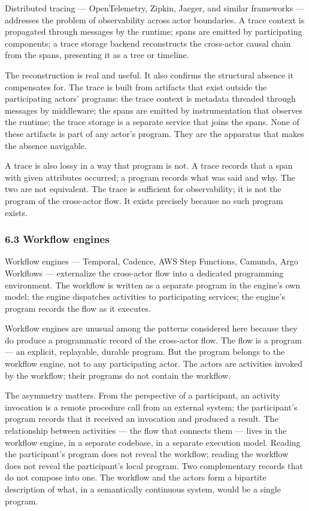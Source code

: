 \documentclass[
]{article}
\begin{document}
Distributed tracing --- OpenTelemetry, Zipkin, Jaeger, and similar
frameworks --- addresses the problem of observability across actor
boundaries. A trace context is propagated through messages by the
runtime; spans are emitted by participating components; a trace storage
backend reconstructs the cross-actor causal chain from the spans,
presenting it as a tree or timeline.

The reconstruction is real and useful. It also confirms the structural
absence it compensates for. The trace is built from artifacts that exist
outside the participating actors' programs: the trace context is
metadata threaded through messages by middleware; the spans are emitted
by instrumentation that observes the runtime; the trace storage is a
separate service that joins the spans. None of these artifacts is part
of any actor's program. They are the apparatus that makes the absence
navigable.

A trace is also lossy in a way that program is not. A trace records that
a span with given attributes occurred; a program records what was said
and why. The two are not equivalent. The trace is sufficient for
observability; it is not the program of the cross-actor flow. It exists
precisely because no such program exists.

\subsubsection{6.3 Workflow engines}\label{workflow-engines}

Workflow engines --- Temporal, Cadence, AWS Step Functions, Camunda,
Argo Workflows --- externalize the cross-actor flow into a dedicated
programming environment. The workflow is written as a separate program
in the engine's own model; the engine dispatches activities to
participating services; the engine's program records the flow as it
executes.

Workflow engines are unusual among the patterns considered here because
they do produce a programmatic record of the cross-actor flow. The flow
is a program --- an explicit, replayable, durable program. But the
program belongs to the workflow engine, not to any participating actor.
The actors are activities invoked by the workflow; their programs do not
contain the workflow.

The asymmetry matters. From the perspective of a participant, an
activity invocation is a remote procedure call from an external system;
the participant's program records that it received an invocation and
produced a result. The relationship between activities --- the flow that
connects them --- lives in the workflow engine, in a separate codebase,
in a separate execution model. Reading the participant's program does
not reveal the workflow; reading the workflow does not reveal the
participant's local program. Two complementary records that do not
compose into one. The workflow and the actors form a bipartite
description of what, in a semantically continuous system, would be a
single program.
\end{document}
